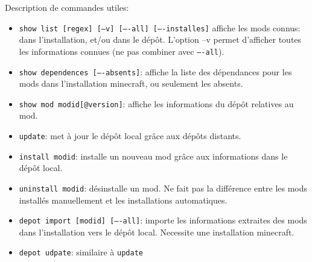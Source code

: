 \documentclass{article}
\begin{document}
\medskip
Description de commandes utiles:
\begin{itemize}
    \item \texttt{show list [regex] [--v] [----all] [----installes]} affiche les mods connus: dans l'installation, et/ou dans le dépôt.
L'option --v permet d'afficher toutes les informations connues (ne pas combiner avec \texttt{----all}).
    \item \texttt{show dependences [----absents]}: affiche la liste des dépendances pour les mods dans l'installation minecraft, ou seulement les absents.
    \item \texttt{show mod modid[@version]}: affiche les informations du dépôt relatives au mod.
    \item \texttt{update}: met à jour le dépôt local grâce aux dépôts distants.
    \item \texttt{install modid}: installe un nouveau mod grâce aux informations dans le dépôt local.
    \item \texttt{uninstall modid}: désinstalle un mod. Ne fait pas la différence entre les mods installés manuellement et les installations automatiques.
    \item \texttt{depot import [modid] [----all]}: importe les informations extraites des mods dans l'installation vers le dépôt local.
Necessite une installation minecraft.
    \item \texttt{depot udpate}: similaire à \texttt{update}
\end{itemize}
\end{document}
